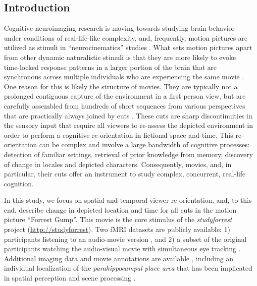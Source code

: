 \documentclass[10pt,a4paper]{article}
\begin{document}
\begin{multicols}{2}

\section*{Introduction}

Cognitive neuroimaging research is moving towards studying brain behavior under
conditions of real-life-like complexity, and, frequently, motion pictures are
utilized as stimuli in ``neurocinematics'' studies
\citep{hasson_2008_neurocinematics}. What sets motion pictures apart from other
dynamic naturalistic stimuli is that they are more likely to evoke time-locked
response patterns in a larger portion of the brain that are synchronous across
multiple individuals who are experiencing the same movie
\citep{hasson_2009_natural_stim_review,lankinen_2014_MEG_during_movie}. One
reason for this is likely the structure of movies. They are typically not a
prolonged contiguous capture of the environment in a first person view, but are
carefully assembled from hundreds of short sequences from various perspectives
that are practically always joined by cuts
\citep{cutting_2011_changing_poetics_of_dissolve}. These cuts are sharp
discontinuities in the sensory input that require all viewers to re-assess the
depicted environment in order to perform a cognitive re-orientation in
fictional space and time. This re-orientation can be complex and involve a
large bandwidth of cognitive processes: detection of familiar settings,
retrieval of prior knowledge from memory, discovery of change in locales and
depicted characters. Consequently, movies, and, in particular, their cuts offer
an instrument to study complex, concurrent, real-life cognition.

In this study, we focus on spatial and temporal viewer re-orientation, and, to
this end, describe change in depicted location and time for all cuts in the
motion picture ``Forrest Gump''. This movie is the core stimulus of the
\textit{studyforrest} project (\url{http://studyforrest}). Two fMRI datasets
are publicly available: 1) participants listening to an audio-movie version
\citep{HBI+14}, and 2) a subset of the original participants watching the
audio-visual movie with simultaneous eye tracking \citep{HAK+16}. Additional
imaging data and movie annotations are available \citep{HDH+2015,LRS+2015},
including an individual localization of the \textit{parahippocampal place area}
\citep{SKG+16} that has been implicated in spatial perception and scene
processing \citep{EK1998}.


\end{multicols}
\end{document}
